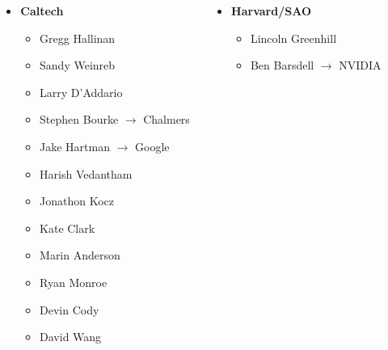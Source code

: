 \documentclass{beamer}
\begin{document}
\begin{frame}
    \begin{columns}[t]
        \begin{column}{0.1\textwidth}
        \end{column}
        \begin{column}{0.4\textwidth}
            \begin{itemize}[leftmargin=0in]
                \item[] \textbf{Caltech}
                    \begin{itemize}[leftmargin=0.5cm]
                        \item[] {\footnotesize \color{yellow} Gregg Hallinan}
                        \item[] {\footnotesize Sandy Weinreb}
                        \item[] {\footnotesize Larry D'Addario}
                        \item[] {\footnotesize Stephen Bourke} {\tiny $\rightarrow$ Chalmers}
                        \item[] {\footnotesize Jake Hartman} {\tiny $\rightarrow$ Google}
                        \item[] {\footnotesize Harish Vedantham}
                        \item[] {\footnotesize Jonathon Kocz}
                        \item[] {\footnotesize Kate Clark}
                        \item[] {\footnotesize \color{yellow} Marin Anderson}
                        \item[] {\footnotesize \color{yellow} Ryan Monroe}
                        \item[] {\footnotesize Devin Cody}
                        \item[] {\footnotesize David Wang}
                    \end{itemize}
            \end{itemize}
        \end{column}
        \begin{column}{0.4\textwidth}
            \begin{itemize}[leftmargin=0in]
                \item[] \textbf{Harvard/SAO}
                    \begin{itemize}[leftmargin=0.5cm]
                        \item[] {\footnotesize Lincoln Greenhill}
                        \item[] {\footnotesize Ben Barsdell} {\tiny $\rightarrow$ NVIDIA}

\end{itemize}
\end{itemize}
\end{column}
\end{columns}
\end{frame}
\end{document}
